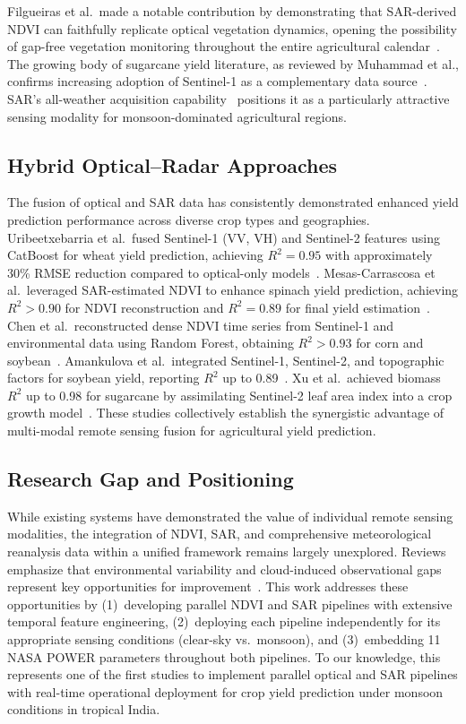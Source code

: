 \documentclass[conference]{IEEEtran}
\begin{document}
Filgueiras et al.\ made a notable contribution by demonstrating that
SAR-derived NDVI can faithfully replicate optical vegetation dynamics,
opening the possibility of gap-free vegetation monitoring throughout the
entire agricultural calendar~\cite{filgueiras2019}. The growing body of
sugarcane yield literature, as reviewed by Muhammad et al., confirms
increasing adoption of Sentinel-1 as a complementary data
source~\cite{muhammad2026}. SAR's all-weather acquisition
capability~\cite{esa2022} positions it as a particularly attractive sensing
modality for monsoon-dominated agricultural regions.

\subsection{Hybrid Optical--Radar Approaches}

The fusion of optical and SAR data has consistently demonstrated enhanced
yield prediction performance across diverse crop types and geographies.
Uribeetxebarria et al.\ fused Sentinel-1 (VV, VH) and Sentinel-2 features
using CatBoost for wheat yield prediction, achieving $R^2 = 0.95$ with
approximately 30\% RMSE reduction compared to optical-only
models~\cite{uribe2023}. Mesas-Carrascosa et al.\ leveraged SAR-estimated
NDVI to enhance spinach yield prediction, achieving $R^2 > 0.90$ for NDVI
reconstruction and $R^2 = 0.89$ for final yield
estimation~\cite{mesas2023}. Chen et al.\ reconstructed dense NDVI time
series from Sentinel-1 and environmental data using Random Forest, obtaining
$R^2 > 0.93$ for corn and soybean~\cite{chen2023}. Amankulova et al.\
integrated Sentinel-1, Sentinel-2, and topographic factors for soybean yield,
reporting $R^2$ up to 0.89~\cite{aman2024}. Xu et al.\ achieved biomass
$R^2$ up to 0.98 for sugarcane by assimilating Sentinel-2 leaf area index
into a crop growth model~\cite{xu2025}. These studies collectively
establish the synergistic advantage of multi-modal remote sensing fusion for
agricultural yield prediction.

\subsection{Research Gap and Positioning}

While existing systems have demonstrated the value of individual remote
sensing modalities, the integration of NDVI, SAR, and comprehensive
meteorological reanalysis data within a unified framework remains largely
unexplored. Reviews emphasize that environmental variability and
cloud-induced observational gaps represent key opportunities for
improvement~\cite{narimani2026,muhammad2026}. This work addresses these
opportunities by (1)~developing parallel NDVI and SAR pipelines with
extensive temporal feature engineering, (2)~deploying each pipeline
independently for its appropriate sensing conditions (clear-sky vs.\ monsoon),
and (3)~embedding 11 NASA POWER parameters throughout both pipelines.
To our knowledge, this represents one of the first studies to implement
parallel optical and SAR pipelines with real-time operational deployment
for crop yield prediction under monsoon conditions in tropical India.
\end{document}
